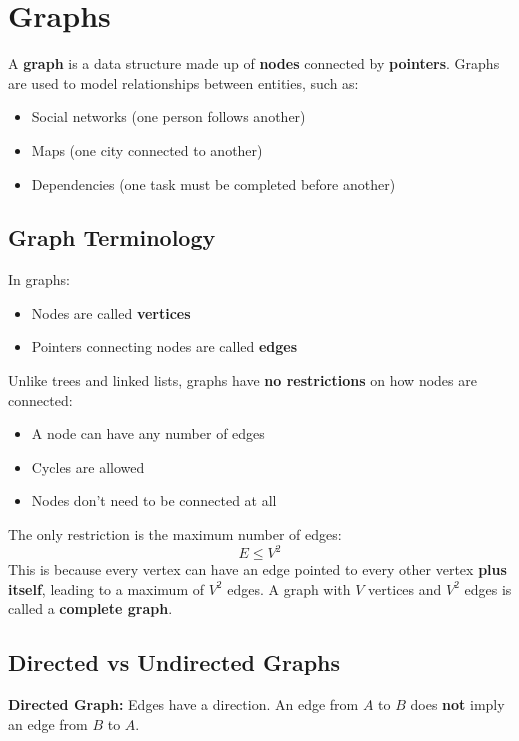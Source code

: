 \section{Graphs}

A \textbf{graph} is a data structure made up of \textbf{nodes} connected by \textbf{pointers}.
Graphs are used to model relationships between entities, such as:
\begin{itemize}
  \item Social networks (one person follows another)
  \item Maps (one city connected to another)
  \item Dependencies (one task must be completed before another)
\end{itemize}

\subsection{Graph Terminology}

In graphs:
\begin{itemize}
  \item Nodes are called \textbf{vertices}
  \item Pointers connecting nodes are called \textbf{edges}
\end{itemize}

Unlike trees and linked lists, graphs have \textbf{no restrictions} on how nodes are connected:
\begin{itemize}
  \item A node can have any number of edges
  \item Cycles are allowed
  \item Nodes don't need to be connected at all
\end{itemize}

The only restriction is the maximum number of edges:
\[
E \leq V^2
\]
This is because every vertex can have an edge pointed to every other vertex \textbf{plus itself}, leading to a maximum of $V^2$ edges. A graph with $V$ vertices and $V^2$ edges is called a \textbf{complete graph}.

\subsection{Directed vs Undirected Graphs}

\textbf{Directed Graph:}
Edges have a direction. An edge from $A$ to $B$ does \textbf{not} imply an edge from $B$ to $A$.

